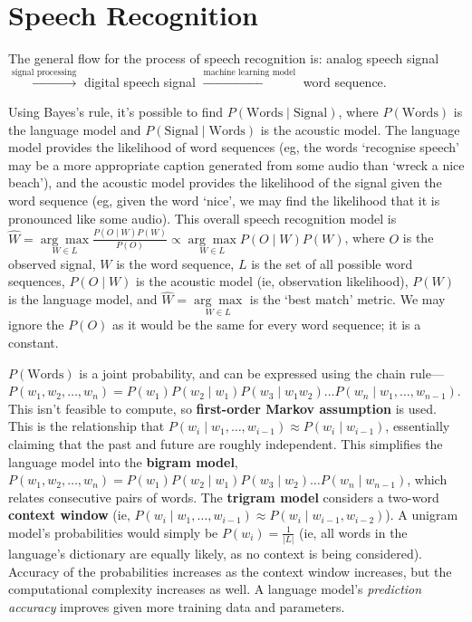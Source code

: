 
\section{Speech Recognition}\label{sub:speech_recognition}

The general flow for the process of speech recognition is: analog speech signal $\overset{\text{signal processing}}{\rightarrow}$ digital speech signal $\overset{\text{machine learning model}}{\rightarrow}$ word sequence.

Using Bayes's rule, it's possible to find $P(\text{Words} \mid \text{Signal})$, where $P(\text{Words})$ is the language model and $P(\text{Signal} \mid \text{Words})$ is the acoustic model. The language model provides the likelihood of word sequences (eg, the words `recognise speech' may be a more appropriate caption generated from some audio than `wreck a nice beach'), and the acoustic model provides the likelihood of the signal given the word sequence (eg, given the word `nice', we may find the likelihood that it is pronounced like some audio). This overall speech recognition model is $\hat{W} = \underset{W \in L}{\arg \max} \frac{P(O \mid W)P(W)}{P(O)} \propto \underset{W \in L}{\arg \max} P(O \mid W)P(W)$, where $O$ is the observed signal, $W$ is the word sequence, $L$ is the set of all possible word sequences, $P(O \mid W)$ is the acoustic model (ie, observation likelihood), $P(W)$ is the language model, and $\hat{W} = \underset{W \in L}{\arg \max}$ is the `best match' metric. We may ignore the $P(O)$ as it would be the same for every word sequence; it is a constant.

$P(\text{Words})$ is a joint probability, and can be expressed using the chain rule---$P(w_{1}, w_{2}, \ldots, w_{n}) = P(w_{1})P(w_{2} \mid w_{1}) P(w_{3} \mid w_{1}w_{2}) \ldots P(w_{n} \mid w_{1}, \ldots, w_{n-1})$. This isn't feasible to compute, so \textbf{first-order Markov assumption} is used. This is the relationship that $P(w_{i} \mid w_{1}, \ldots, w_{i-1}) \approx P(w_{i} \mid w_{i-1})$, essentially claiming that the past and future are roughly independent. This simplifies the language model into the \textbf{bigram model}, $P(w_{1}, w_{2}, \ldots, w_{n}) = P(w_{1})P(w_{2} \mid w_{1}) P(w_{3} \mid w_{2}) \ldots P(w_{n} \mid w_{n-1})$, which relates consecutive pairs of words. The \textbf{trigram model} considers a two-word \textbf{context window} (ie, $P(w_{i} \mid w_{1}, \ldots, w_{i-1}) \approx P(w_{i} \mid w_{i-1}, w_{i-2})$). A unigram model's probabilities would simply be $P(w_{i}) = \frac{1}{|L|}$ (ie, all words in the language's dictionary are equally likely, as no context is being considered). Accuracy of the probabilities increases as the context window increases, but the computational complexity increases as well. A language model's \emph{prediction accuracy} improves given more training data and parameters.

